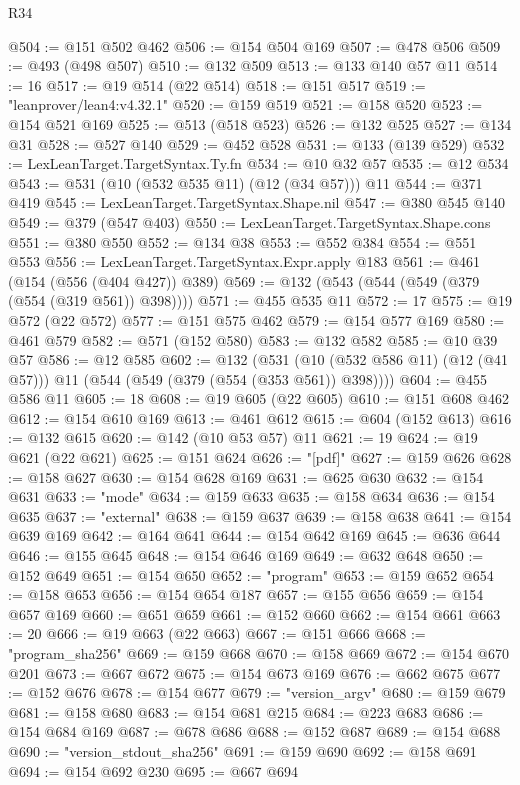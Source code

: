 \begin{lexlean}{R34}
\begin{coremodule}
@504 := @151 @502 @462
@506 := @154 @504 @169
@507 := @478 @506
@509 := @493 (@498 @507)
@510 := @132 @509
@513 := @133 @140 @57 @11
@514 := 16
@517 := @19 @514 (@22 @514)
@518 := @151 @517
@519 := "leanprover/lean4:v4.32.1"
@520 := @159 @519
@521 := @158 @520
@523 := @154 @521 @169
@525 := @513 (@518 @523)
@526 := @132 @525
@527 := @134 @31
@528 := @527 @140
@529 := @452 @528
@531 := @133 (@139 @529)
@532 := LexLeanTarget.TargetSyntax.Ty.fn
@534 := @10 @32 @57
@535 := @12 @534
@543 := @531 (@10 (@532 @535 @11) (@12 (@34 @57))) @11
@544 := @371 @419
@545 := LexLeanTarget.TargetSyntax.Shape.nil
@547 := @380 @545 @140
@549 := @379 (@547 @403)
@550 := LexLeanTarget.TargetSyntax.Shape.cons
@551 := @380 @550
@552 := @134 @38
@553 := @552 @384
@554 := @551 @553
@556 := LexLeanTarget.TargetSyntax.Expr.apply @183
@561 := @461 (@154 (@556 (@404 @427)) @389)
@569 := @132 (@543 (@544 (@549 (@379 (@554 (@319 @561)) @398))))
@571 := @455 @535 @11
@572 := 17
@575 := @19 @572 (@22 @572)
@577 := @151 @575 @462
@579 := @154 @577 @169
@580 := @461 @579
@582 := @571 (@152 @580)
@583 := @132 @582
@585 := @10 @39 @57
@586 := @12 @585
@602 := @132
    (@531 (@10 (@532 @586 @11) (@12 (@41 @57))) @11 (@544 (@549 (@379 (@554 (@353 @561)) @398))))
@604 := @455 @586 @11
@605 := 18
@608 := @19 @605 (@22 @605)
@610 := @151 @608 @462
@612 := @154 @610 @169
@613 := @461 @612
@615 := @604 (@152 @613)
@616 := @132 @615
@620 := @142 (@10 @53 @57) @11
@621 := 19
@624 := @19 @621 (@22 @621)
@625 := @151 @624
@626 := "[pdf]"
@627 := @159 @626
@628 := @158 @627
@630 := @154 @628 @169
@631 := @625 @630
@632 := @154 @631
@633 := "mode"
@634 := @159 @633
@635 := @158 @634
@636 := @154 @635
@637 := "external"
@638 := @159 @637
@639 := @158 @638
@641 := @154 @639 @169
@642 := @164 @641
@644 := @154 @642 @169
@645 := @636 @644
@646 := @155 @645
@648 := @154 @646 @169
@649 := @632 @648
@650 := @152 @649
@651 := @154 @650
@652 := "program"
@653 := @159 @652
@654 := @158 @653
@656 := @154 @654 @187
@657 := @155 @656
@659 := @154 @657 @169
@660 := @651 @659
@661 := @152 @660
@662 := @154 @661
@663 := 20
@666 := @19 @663 (@22 @663)
@667 := @151 @666
@668 := "program_sha256"
@669 := @159 @668
@670 := @158 @669
@672 := @154 @670 @201
@673 := @667 @672
@675 := @154 @673 @169
@676 := @662 @675
@677 := @152 @676
@678 := @154 @677
@679 := "version_argv"
@680 := @159 @679
@681 := @158 @680
@683 := @154 @681 @215
@684 := @223 @683
@686 := @154 @684 @169
@687 := @678 @686
@688 := @152 @687
@689 := @154 @688
@690 := "version_stdout_sha256"
@691 := @159 @690
@692 := @158 @691
@694 := @154 @692 @230
@695 := @667 @694

\end{coremodule}
\end{lexlean}
